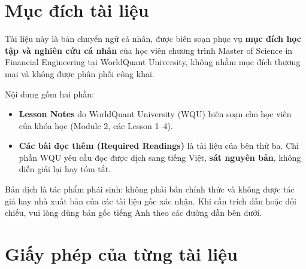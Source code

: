 

\thispagestyle{empty}

\section*{Mục đích tài liệu}

Tài liệu này là bản chuyển ngữ cá nhân, được biên soạn phục vụ \textbf{mục đích học tập và nghiên cứu cá nhân} của học viên chương trình Master of Science in Financial Engineering tại WorldQuant University, không nhằm mục đích thương mại và không được phân phối công khai.

Nội dung gồm hai phần:
\begin{itemize}
  \item \textbf{Lesson Notes} do WorldQuant University (WQU) biên soạn cho học viên của khóa học (Module 2, các Lesson 1--4).
  \item \textbf{Các bài đọc thêm (Required Readings)} là tài liệu của bên thứ ba. Chỉ phần WQU yêu cầu đọc được dịch sang tiếng Việt, \textbf{sát nguyên bản}, không diễn giải lại hay tóm tắt.
\end{itemize}

Bản dịch là tác phẩm phái sinh: không phải bản chính thức và không được tác giả hay nhà xuất bản của các tài liệu gốc xác nhận. Khi cần trích dẫn hoặc đối chiếu, vui lòng dùng bản gốc tiếng Anh theo các đường dẫn bên dưới.

\section*{Giấy phép của từng tài liệu}

